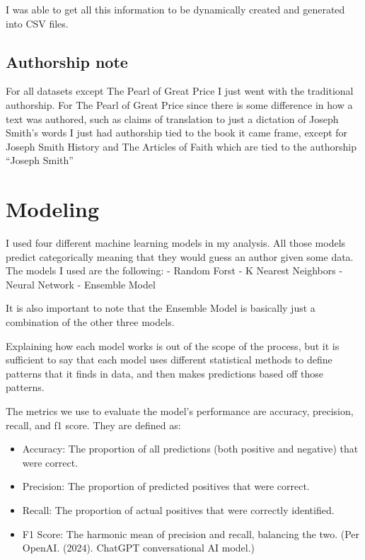 \documentclass[
  letterpaper,
  DIV=11,
  numbers=noendperiod]{scrartcl}
\providecommand{\tightlist}{%
  \setlength{\itemsep}{0pt}\setlength{\parskip}{0pt}}\usepackage{longtable,booktabs,array}
\begin{document}
I was able to get all this information to be dynamically created and
generated into CSV files.

\hypertarget{authorship-note}{%
\subsection{Authorship note}\label{authorship-note}}

For all datasets except The Pearl of Great Price I just went with the
traditional authorship. For The Pearl of Great Price since there is some
difference in how a text was authored, such as claims of translation to
just a dictation of Joseph Smith's words I just had authorship tied to
the book it came frame, except for Joseph Smith History and The Articles
of Faith which are tied to the authorship ``Joseph Smith''

\hypertarget{modeling}{%
\section{Modeling}\label{modeling}}

I used four different machine learning models in my analysis. All those
models predict categorically meaning that they would guess an author
given some data. The models I used are the following: - Random Forst - K
Nearest Neighbors - Neural Network - Ensemble Model

It is also important to note that the Ensemble Model is basically just a
combination of the other three models.

Explaining how each model works is out of the scope of the process, but
it is sufficient to say that each model uses different statistical
methods to define patterns that it finds in data, and then makes
predictions based off those patterns.

The metrics we use to evaluate the model's performance are accuracy,
precision, recall, and f1 score. They are defined as:

\begin{itemize}
\tightlist
\item
  Accuracy: The proportion of all predictions (both positive and
  negative) that were correct.
\item
  Precision: The proportion of predicted positives that were correct.
\item
  Recall: The proportion of actual positives that were correctly
  identified.
\item
  F1 Score: The harmonic mean of precision and recall, balancing the
  two. (Per OpenAI. (2024). ChatGPT conversational AI model.)
\end{itemize}
\end{document}
